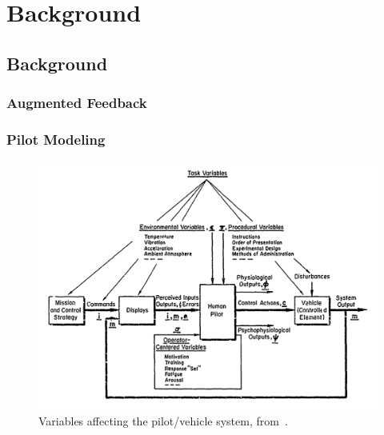 \chapter{Background}
\label{chap:background}

% 

\section{Background}
\subsection{Augmented Feedback}

\subsection{Pilot Modeling}
\begin{figure}[tb]
    \begin{center}
        \includegraphics[width=0.8\linewidth]{figures/Screen_Shot_2018-07-25_at_10_37_08_AM.png}
        \caption{Variables affecting the pilot/vehicle system, from~\citep{mcruer_mathematical_1974}.}
        \label{figure:mcruer1974}
    \end{center}
\end{figure}

